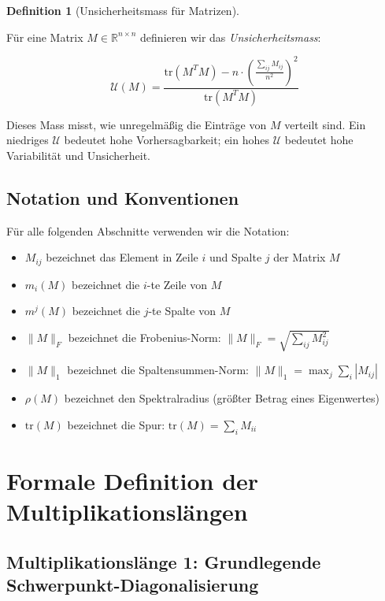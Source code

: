 \documentclass[a4paper,12pt]{article}
\theoremstyle{definition}
\newtheorem{definition}{Definition}
\begin{document}
\begin{definition}[Unsicherheitsmass für Matrizen]
\label{def:unsicherheit}

Für eine Matrix $M \in \mathbb{R}^{n \times n}$ definieren wir das \emph{Unsicherheitsmass}:

\begin{equation}
\mathcal{U}(M) = \frac{\text{tr}(M^T M) - n \cdot \left(\frac{\sum_{ij} M_{ij}}{n^2}\right)^2}{\text{tr}(M^T M)}
\end{equation}

Dieses Mass misst, wie unregelmäßig die Einträge von $M$ verteilt sind. Ein niedriges $\mathcal{U}$ bedeutet hohe Vorhersagbarkeit; ein hohes $\mathcal{U}$ bedeutet hohe Variabilität und Unsicherheit.

\end{definition}

\subsection{Notation und Konventionen}

Für alle folgenden Abschnitte verwenden wir die Notation:

\begin{itemize}
\item $M_{ij}$ bezeichnet das Element in Zeile $i$ und Spalte $j$ der Matrix $M$
\item $m_i(M)$ bezeichnet die $i$-te Zeile von $M$
\item $m^j(M)$ bezeichnet die $j$-te Spalte von $M$
\item $\|M\|_F$ bezeichnet die Frobenius-Norm: $\|M\|_F = \sqrt{\sum_{ij} M_{ij}^2}$
\item $\|M\|_1$ bezeichnet die Spaltensummen-Norm: $\|M\|_1 = \max_j \sum_i |M_{ij}|$
\item $\rho(M)$ bezeichnet den Spektralradius (größter Betrag eines Eigenwertes)
\item $\text{tr}(M)$ bezeichnet die Spur: $\text{tr}(M) = \sum_i M_{ii}$
\end{itemize}

\section{Formale Definition der Multiplikationslängen}

\subsection{Multiplikationslänge 1: Grundlegende Schwerpunkt-Diagonalisierung}
\end{document}

